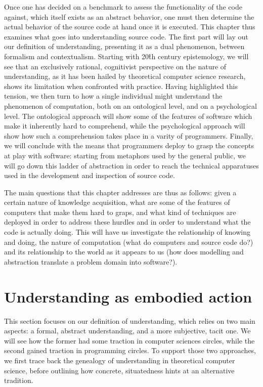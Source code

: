 Once one has decided on a benchmark to assess the functionality of the code against, which itself exists as an abstract behavior, one must then determine the actual behavior of the source code at hand once it is executed. This chapter thus examines what goes into understanding source code. The first part will lay out our definition of understanding, presenting it as a dual phenomenon, between formalism and contextualism. Starting with 20\^{th} century epistemology, we will see that an exclusively rational, cognitivist perspective on the nature of understanding, as it has been hailed by theoretical computer science research, shows its limitation when confronted with practice. Having highlighted this tension, we then turn to how a single individual might understand the phenomenon of computation, both on an ontological level, and on a psychological level. The ontological approach will show some of the features of software which make it inherently hard to comprehend, while the psychological approach will show how such a comprehension takes place in a varity of programmers. Finally, we will conclude with the means that programmers deploy to grasp the concepts at play with software: starting from metaphors used by the general public, we will go down this ladder of abstraction in order to reach the technical apparatuses used in the development and inspection of source code.

The main questions that this chapter addresses are thus as follows: given a certain nature of knowledge acquisition, what are some of the features of computers that make them hard to graps, and what kind of techniques are deployed in order to address these hurdles and in order to understand what the code is actually doing. This will have us investigate the relationship of knowing and doing, the nature of computation (what do computers and source code do?) and its relationship to the world as it appears to us (how does modelling and abstraction translate a problem domain into software?).

\section{Understanding as embodied action} %

This section focuses on our definition of understanding, which relies on two main aspects: a formal, abstract understanding, and a more subjective, tacit one. We will see how the former had some traction in computer sciences circles, while the second gained traction in programming circles. To support those two approaches, we first trace back the genealogy of understanding in theoretical computer science, before outlining how concrete, situatedness hints at an alternative tradition.

